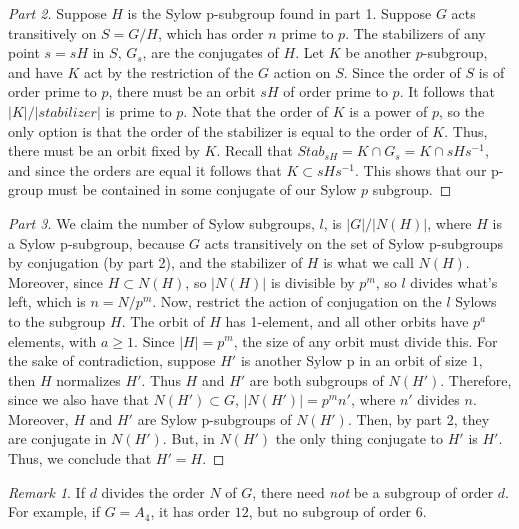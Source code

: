 \documentclass[12pt]{article}
\theoremstyle{definition}
\theoremstyle{remark}
\newtheorem{rmk}[thm]{Remark}
\numberwithin{equation}{section}
\begin{document}
\begin{proof}[Part 2]
        Suppose $H$ is the Sylow p-subgroup found in part 1. Suppose $G$ acts transitively on $S = G/H$, which has order $n$ prime to $p$. The stabilizers of any point $s = sH$ in $S$, $G_s$, are the conjugates of $H$. Let $K$ be another $p$-subgroup, and have $K$ act by the restriction of the $G$ action on $S$. Since the order of $S$ is of order prime to $p$, there must be an orbit $sH$ of order prime to $p$. It follows that $|K|/|stabilizer|$ is prime to $p$. Note that the order of $K$ is a power of $p$, so the only option is that the order of the stabilizer is equal to the order of $K$. Thus, there must be an orbit fixed by $K$. Recall that $Stab_{sH} = K \cap G_s = K \cap sHs^{-1}$, and since the orders are equal it follows that $K \subset sHs^{-1}$. This shows that our p-group must be contained in some conjugate of our Sylow $p$ subgroup.
\end{proof}
\begin{proof}[Part 3]
        We claim the number of Sylow subgroups, $l$, is $|G|/|N(H)|$, where $H$ is a Sylow p-subgroup, because $G$ acts transitively on the set of Sylow p-subgroups by conjugation (by part 2), and the stabilizer of $H$ is what we call $N(H)$. Moreover, since $H \subset N(H)$, so $|N(H)|$ is divisible by $p^m$, so $l$ divides what's left, which is $n = N/p^m$. Now, restrict the action of conjugation on the $l$ Sylows to the subgroup $H$. The orbit of $H$ has 1-element, and all other orbits have $p^a $ elements, with $a \geq 1$. Since $|H| = p^m$, the size of any orbit must divide this. For the sake of contradiction, suppose $H'$ is another Sylow p in an orbit of size $1$, then $H$ normalizes $H'$. Thus $H$ and $H'$ are both subgroups of $N(H')$. Therefore, since we also have that $N(H') \subset G$, $|N(H')| = p^mn'$, where $n'$ divides $n$. Moreover, $H$ and $H'$ are Sylow p-subgroups of $N(H')$. Then, by part 2, they are conjugate in $N(H')$. But, in $N(H')$ the only thing conjugate to $H'$ is $H'$. Thus, we conclude that $H' = H$.
\end{proof}




\vspace{15pt}

\begin{rmk}
        If $d$ divides the order $N$ of $G$, there need \emph{not} be a subgroup of order $d$. For example, if $G = A_4$, it has order $12$, but no subgroup of order $6$.
\end{rmk}
\end{document}
